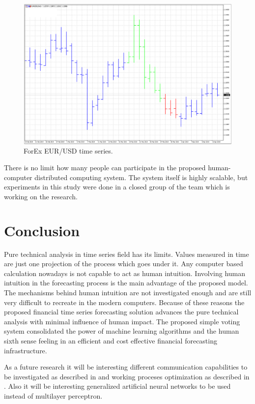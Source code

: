 \documentclass[runningheads]{llncs}
\begin{document}
\begin{figure}
\includegraphics[width=1.0\textwidth]{fig03.png}
\centering
\caption{ForEx EUR/USD time series.} \label{fig03}
\end{figure}
\FloatBarrier

There is no limit how many people can participate in the proposed human-computer distributed computing system. The system itself is highly scalable, but experiments in this study were done in a closed group of the team which is working on the research. 

\section{Conclusion} \label{Conclusion}

Pure technical analysis in time series field has its limits. Values measured in time are just one projection of the process which goes under it. Any computer based calculation nowadays is not capable to act as human intuition. Involving human intuition in the forecasting process is the main advantage of the proposed model. The mechanisms behind human intuition are not investigated enough and are still very difficult to recreate in the modern computers. Because of these reasons the proposed financial time series forecasting solution advances the pure technical analysis with minimal influence of human impact. The proposed simple voting system consolidated the power of machine learning algorithms and the human sixth sense feeling in an efficient and cost effective financial forecasting infrastructure.

As a future research it will be interesting different communication capabilities to be investigated as described in \cite{alexandrov01} and working proceses optimization as described in \cite{atanasov01}. Also it will be interesting generalized artificial neural networks \cite{tashev01} to be used instead of multilayer perceptron.
\end{document}
